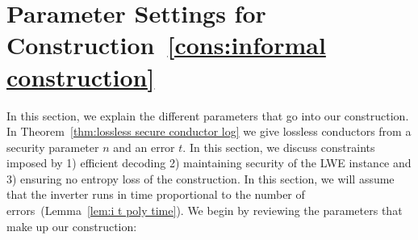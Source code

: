 \documentclass[11pt]{article}
\newcommand{\thref}[1]{\mbox{Theorem~\ref{#1}}}
\newcommand{\lemref}[1]{\mbox{Lemma~\ref{#1}}}
\newcommand{\consref}[1]{\mbox{Construction~\ref{#1}}}
\begin{document}
\section{Parameter Settings for \consref{cons:informal construction}}
\label{sec:parameter settings}
In this section, we explain the different parameters that go into our construction.  In \thref{thm:lossless secure conductor log} we give lossless conductors from a security parameter $n$ and an error $t$.  In this section, we discuss constraints imposed by 1) efficient decoding 2) maintaining security of the LWE instance and 3) ensuring no entropy loss of the construction.  In this section, we will assume that the inverter runs in time proportional to the number of errors~(\lemref{lem:i t poly time}).  We begin by reviewing the parameters that make up our construction:
\end{document}

